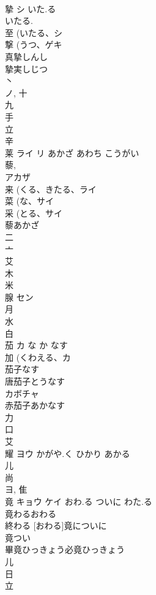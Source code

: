 \documentclass[8pt]{extreport}
\begin{document}
\begin{CJK}{UTF8}{min}
\\	摯	シ	いた.る	
\\	いたる. 
\\	至 (いたる、シ 
\\	撃 (うつ、ゲキ 
\\	真摯しんし
\\	摯実しじつ
\\	丶 
\\	ノ, 十 
\\	九 
\\	手 
\\	立 
\\	辛 
\\	莱	ライ リ	あかざ あわち こうがい	
\\	藜, 
\\	アカザ 
\\	来 (くる、きたる、ライ 
\\	菜 (な、サイ 
\\	采 (とる、サイ 
\\	藜あかざ
\\	二 
\\	亠 
\\	艾 
\\	木 
\\	米 
\\	腺	セン		
\\	月 
\\	水 
\\	白 
\\	茄	カ	な か なす	
\\	加 (くわえる、カ 
\\	茄子なす 
\\	唐茄子とうなす 
\\	カボチャ
\\	赤茄子あかなす 
\\	力 
\\	口 
\\	艾 
\\	耀	ヨウ	かがや.く ひかり あかる	
\\	儿 
\\	尚 
\\	ヨ, 隹 
\\	竟	キョウ ケイ	おわ.る ついに わた.る	
\\	竟わるおわる
\\	終わる [おわる]竟についに
\\	竟つい
\\	畢竟ひっきょう必竟ひっきょう
\\	儿 
\\	日 
\\	立 

\end{CJK}
\end{document}
